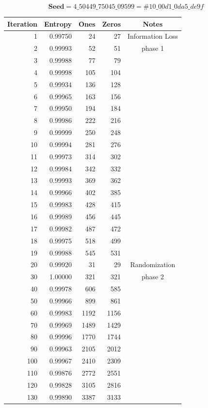 \documentclass[letterpaper]{article}
\begin{document}
\begin{multicols}{2}
\begin{center}
$$\textbf{Seed} = 4\_50449\_75045\_09599 = \#10\_00d1\_0da5\_de9f$$
\begin{tabular}{|r|r|r|r|c|}
\hline
\textbf{Iteration} & \textbf{Entropy} & \textbf{Ones} & \textbf{Zeros} & \textbf{Notes}\\
\hline
1 & 0.99750 & 24 & 27 & Information Loss \\
2 & 0.99993 & 52 & 51 & phase 1\\
3 & 0.99988 & 77 & 79 & \\
4 & 0.99998 & 105 & 104 & \\
5 & 0.99934 & 136 & 128 & \\
6 & 0.99965 & 163 & 156 & \\
7 & 0.99950 & 194 & 184 & \\
8 & 0.99986 & 222 & 216 & \\
9 & 0.99999 & 250 & 248 & \\
10 & 0.99994 & 281 & 276 & \\
11 & 0.99973 & 314 & 302 & \\
12 & 0.99984 & 342 & 332 & \\
13 & 0.99993 & 369 & 362 & \\
14 & 0.99966 & 402 & 385 & \\
15 & 0.99983 & 428 & 415 & \\
16 & 0.99989 & 456 & 445 & \\
17 & 0.99982 & 487 & 472 & \\
18 & 0.99975 & 518 & 499 & \\
19 & 0.99988 & 545 & 531 & \\
\hline
20 & 0.99920 & 31 & 29  & Randomization\\
30 & 1.00000 & 321 & 321 &  phase 2 \\
40 & 0.99978 & 606 & 585 & \\
50 & 0.99966 & 899 & 861 & \\
60 & 0.99983 & 1192 & 1156 & \\
70 & 0.99969 & 1489 & 1429 & \\
80 & 0.99996 & 1770 & 1744 & \\
90 & 0.99963 & 2105 & 2012 & \\
100 & 0.99967 & 2410 & 2309 & \\
110 & 0.99876 & 2772 & 2551 & \\
120 & 0.99828 & 3105 & 2816 & \\
130 & 0.99890 & 3387 & 3133 & \\
\hline
\end{tabular}


\end{center}
\end{multicols}
\end{document}
